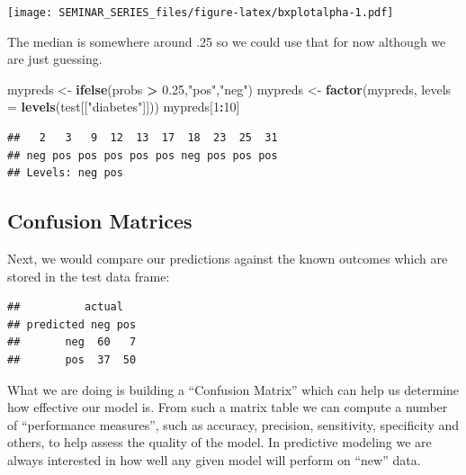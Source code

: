 \documentclass[]{book}
\newenvironment{Shaded}{\begin{snugshade}}{\end{snugshade}}
\newcommand{\KeywordTok}[1]{\textcolor[rgb]{0.13,0.29,0.53}{\textbf{#1}}}
\newcommand{\DataTypeTok}[1]{\textcolor[rgb]{0.13,0.29,0.53}{#1}}
\newcommand{\DecValTok}[1]{\textcolor[rgb]{0.00,0.00,0.81}{#1}}
\newcommand{\FloatTok}[1]{\textcolor[rgb]{0.00,0.00,0.81}{#1}}
\newcommand{\StringTok}[1]{\textcolor[rgb]{0.31,0.60,0.02}{#1}}
\newcommand{\CommentTok}[1]{\textcolor[rgb]{0.56,0.35,0.01}{\textit{#1}}}
\newcommand{\OperatorTok}[1]{\textcolor[rgb]{0.81,0.36,0.00}{\textbf{#1}}}
\newcommand{\NormalTok}[1]{#1}
\begin{document}
\texttt{[image: SEMINAR\_SERIES\_files/figure-latex/bxplotalpha-1.pdf]}

The median is somewhere around .25 so we could use that for now although
we are just guessing.

\begin{Shaded}
\begin{Highlighting}[]
\NormalTok{mypreds <-}\StringTok{ }\KeywordTok{ifelse}\NormalTok{(probs }\OperatorTok{>}\StringTok{ }\FloatTok{0.25}\NormalTok{,}\StringTok{"pos"}\NormalTok{,}\StringTok{"neg"}\NormalTok{)}
\NormalTok{mypreds <-}\StringTok{ }\KeywordTok{factor}\NormalTok{(mypreds, }\DataTypeTok{levels =} \KeywordTok{levels}\NormalTok{(test[[}\StringTok{"diabetes"}\NormalTok{]]))}
\NormalTok{mypreds[}\DecValTok{1}\OperatorTok{:}\DecValTok{10}\NormalTok{]}
\end{Highlighting}
\end{Shaded}

\begin{verbatim}
##   2   3   9  12  13  17  18  23  25  31 
## neg pos pos pos pos pos neg pos pos pos 
## Levels: neg pos
\end{verbatim}

\subsection{Confusion Matrices}\label{confusion-matrices}

Next, we would compare our predictions against the known outcomes which
are stored in the test data frame:

\begin{Shaded}
\end{Shaded}

\begin{verbatim}
##          actual
## predicted neg pos
##       neg  60   7
##       pos  37  50
\end{verbatim}

What we are doing is building a ``Confusion Matrix'' which can help us
determine how effective our model is. From such a matrix table we can
compute a number of ``performance measures'', such as accuracy,
precision, sensitivity, specificity and others, to help assess the
quality of the model. In predictive modeling we are always interested in
how well any given model will perform on ``new'' data.
\end{document}
